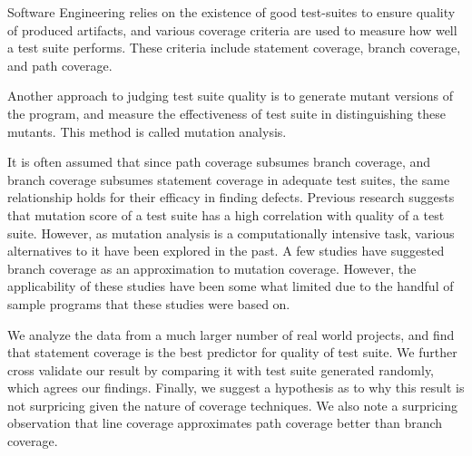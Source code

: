 Software Engineering relies on the existence of good test-suites to ensure quality of produced artifacts, and various coverage criteria are used to measure how well a test suite performs.
These criteria include statement coverage, branch coverage, and path coverage.

Another approach to judging test suite quality is to generate mutant versions of the program, and measure the effectiveness of test suite in distinguishing these mutants.
This method is called mutation analysis.

It is often assumed that since path coverage subsumes branch coverage, and branch coverage subsumes statement coverage in adequate test suites, the same relationship holds for their efficacy in finding defects.
Previous research suggests that mutation score of a test suite has a high correlation with quality of a test suite.
However, as mutation analysis is a computationally intensive task, various alternatives to it have been explored in the past.
A few studies have suggested branch coverage as an approximation to mutation coverage.
However, the applicability of these studies have been some what limited due to the handful of sample programs that these studies were based on.

We analyze the data from a much larger number of real world projects, and find that statement coverage is the best predictor for quality of test suite.
We further cross validate our result by comparing it with test suite generated randomly, which agrees our findings.
Finally, we suggest a hypothesis as to why this result is not surpricing given the nature of coverage techniques.
We also note a surpricing observation that line coverage approximates path coverage better than branch coverage.
